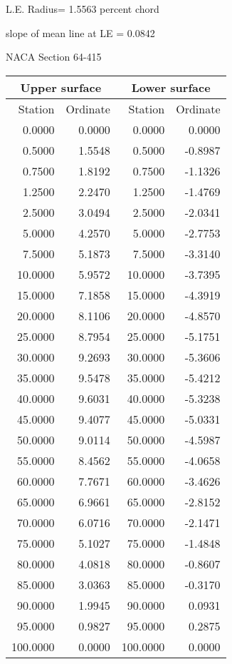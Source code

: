 \documentclass[11pt]{book}
\begin{document}
L.E. Radius=  1.5563 percent chord


 slope of mean line at LE =  0.0842
 \newpage
  \label{s64-415}
 \begin{Large}
 NACA Section 64-415
 \end{Large}
  
 \vspace{8mm}
 \begin{tabular}{|r|r|r|r|} \hline 
 \multicolumn{2}{|c|}{Upper surface} & \multicolumn{2}{|c|}{Lower surface} \\
 \hline
 Station & Ordinate & Station & Ordinate \\
 \hline
0.0000 & 0.0000 & 0.0000 & 0.0000 \\
0.5000 & 1.5548 & 0.5000 & -0.8987 \\
0.7500 & 1.8192 & 0.7500 & -1.1326 \\
1.2500 & 2.2470 & 1.2500 & -1.4769 \\
2.5000 & 3.0494 & 2.5000 & -2.0341 \\
5.0000 & 4.2570 & 5.0000 & -2.7753 \\
7.5000 & 5.1873 & 7.5000 & -3.3140 \\
10.0000 & 5.9572 & 10.0000 & -3.7395 \\
15.0000 & 7.1858 & 15.0000 & -4.3919 \\
20.0000 & 8.1106 & 20.0000 & -4.8570 \\
25.0000 & 8.7954 & 25.0000 & -5.1751 \\
30.0000 & 9.2693 & 30.0000 & -5.3606 \\
35.0000 & 9.5478 & 35.0000 & -5.4212 \\
40.0000 & 9.6031 & 40.0000 & -5.3238 \\
45.0000 & 9.4077 & 45.0000 & -5.0331 \\
50.0000 & 9.0114 & 50.0000 & -4.5987 \\
55.0000 & 8.4562 & 55.0000 & -4.0658 \\
60.0000 & 7.7671 & 60.0000 & -3.4626 \\
65.0000 & 6.9661 & 65.0000 & -2.8152 \\
70.0000 & 6.0716 & 70.0000 & -2.1471 \\
75.0000 & 5.1027 & 75.0000 & -1.4848 \\
80.0000 & 4.0818 & 80.0000 & -0.8607 \\
85.0000 & 3.0363 & 85.0000 & -0.3170 \\
90.0000 & 1.9945 & 90.0000 & 0.0931 \\
95.0000 & 0.9827 & 95.0000 & 0.2875 \\
100.0000 & 0.0000 & 100.0000 & 0.0000 \\
 \hline 
 \end{tabular}
\end{document}
